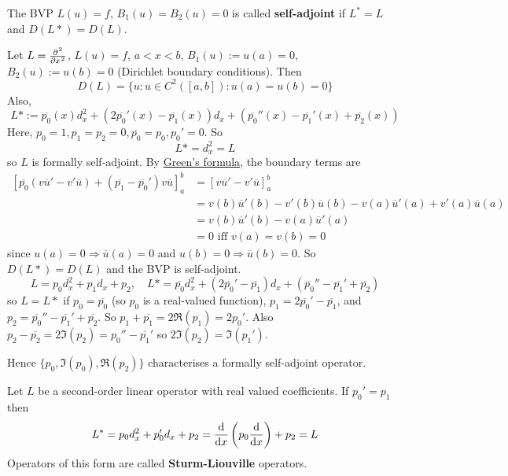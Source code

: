\begin{definition}
	The BVP $L(u) = f$, $B_1(u) = B_2(u) = 0$ is called \textbf{self-adjoint} if $L^* = L$ and $D(L*) = D(L)$.
\end{definition}

\begin{example}
	Let $L = \diffp[2]{}{x}$, $L(u) = f$, $a < x < b$, $B_1(u) := u(a) = 0$, $B_2(u) := u(b) = 0$ (Dirichlet boundary conditions). Then
	\[
		D(L) = \{ u: u \in C^2 ([a, b]): u(a) = u(b) = 0 \}
	\]
	Also,
	\[
		L* := \overline{p_0} (x) d_x^2 + (2 \overline{p_0}'(x) - \overline{p_1}(x)) d_x + (\overline{p_0}''(x) - \overline{p_1}'(x) + \overline{p_2}(x))
	\]
	Here, $p_0 = 1, p_1 = p_2 = 0, \overline{p_0} = p_0, p_0' = 0$. So
	\[
		L* = d_x^2 = L
	\]
	so $L$ is formally self-adjoint. By \hyperref[prop:greensFormula]{Green's formula}, the boundary terms are
	\[
		\begin{aligned}
			{\left[ \overline{p_0} (v \overline{u}' - v' \overline{u}) + (\overline{p_1} - \overline{p_0}') v \overline{u} \right]}_a^b 
				& = {\left[ v \overline{u}' - v' \overline{u} \right]}_a^b \\
				& = v(b) \overline{u}'(b) - v'(b) \overline{u}(b) - v(a) \overline{u}'(a) + v'(a) \overline{u}(a) \\
				& = v(b) \overline{u}'(b) - v(a) \overline{u}'(a) \\
				& = 0 \text{ iff } v(a) = v(b) = 0
		\end{aligned}
	\]
	since $u(a) = 0 \Longrightarrow \overline{u}(a) = 0$ and $u(b) = 0 \Longrightarrow \overline{u}(b) = 0$. So $D(L*) = D(L)$ and the BVP is self-adjoint.
	\[
		L = p_0 d_x^2 + p_1 d_x + p_2, \quad L* = \overline{p_0} d_x^2 + (2 \overline{p_0}' - \overline{p_1}) d_x + (\overline{p_0}'' - \overline{p_1}' + \overline{p_2})
	\]
	so $L = L*$ if $p_0 = \overline{p_0}$ (so $p_0$ is a real-valued function), $p_1 = 2 \overline{p_0}' - \overline{p_1}$, and $p_2 = \overline{p_0}'' - \overline{p_1}' + \overline{p_2}$. So $p_1 + \overline{p_1} = 2 \Re (p_1) = 2 p_0'$. Also $p_2 - \overline{p_2} = 2 \Im(p_2) = p_0'' - \overline{p_1}'$ so $2 \Im(p_2) = \Im(p_1')$.

	Hence $\{ p_0, \Im(p_0), \Re(p_2) \}$ characterises a formally self-adjoint operator.
\end{example}

\begin{definition}
	Let $L$ be a second-order linear operator with real valued coefficients. If $p_0' = p_1$ then
	\[
		L^* = p_0 d_x^2 + p_0' d_x + p_2 = \diff{}{x} \left( p_0 \diff{}{x} \right) + p_2 = L
	\]
	Operators of this form are called \textbf{Sturm-Liouville} operators.
\end{definition}

